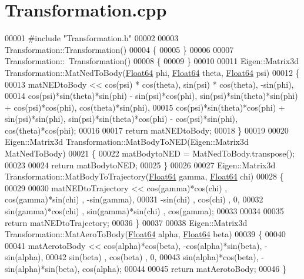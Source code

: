 \hypertarget{_transformation_8cpp_source}{}\section{Transformation.\+cpp}
\label{_transformation_8cpp_source}

\begin{DoxyCode}
00001 \textcolor{preprocessor}{#include "Transformation.h"}
00002 
00003 Transformation::Transformation()
00004 \{
00005 \}
00006 
00007 Transformation::~Transformation()
00008 \{
00009 \}
00010 
00011 Eigen::Matrix3d Transformation::MatNedToBody(\hyperlink{group___tools_ga3f1431cb9f76da10f59246d1d743dc2c}{Float64} phi, \hyperlink{group___tools_ga3f1431cb9f76da10f59246d1d743dc2c}{Float64} theta, 
      \hyperlink{group___tools_ga3f1431cb9f76da10f59246d1d743dc2c}{Float64} psi)
00012 \{
00013     matNEDtoBody << cos(psi) * cos(theta), sin(psi) * cos(theta), -sin(phi),
00014         cos(psi)*sin(theta)*sin(phi) - sin(psi)*cos(phi), sin(psi)*sin(theta)*sin(phi) + cos(psi)*cos(phi),
       cos(theta)*sin(phi),
00015         cos(psi)*sin(theta)*cos(phi) + sin(psi)*sin(phi), sin(psi)*sin(theta)*cos(phi) - cos(psi)*sin(phi),
       cos(theta)*cos(phi);
00016 
00017     \textcolor{keywordflow}{return} matNEDtoBody;
00018 \}
00019 
00020 Eigen::Matrix3d Transformation::MatBodyToNED(Eigen::Matrix3d MatNedToBody)
00021 \{
00022     matBodytoNED = MatNedToBody.transpose();
00023 
00024     \textcolor{keywordflow}{return} matBodytoNED;
00025 \}
00026 
00027 Eigen::Matrix3d Transformation::MatBodyToTrajectory(\hyperlink{group___tools_ga3f1431cb9f76da10f59246d1d743dc2c}{Float64} gamma, 
      \hyperlink{group___tools_ga3f1431cb9f76da10f59246d1d743dc2c}{Float64} chi)
00028 \{
00029 
00030     matNEDtoTrajectory << cos(gamma)*cos(chi)   , cos(gamma)*sin(chi)   , -sin(gamma),
00031                             -sin(chi)           , cos(chi)              , 0,
00032                         sin(gamma)*cos(chi)     , sin(gamma)*sin(chi)   , cos(gamma);
00033 
00034 
00035     \textcolor{keywordflow}{return} matNEDtoTrajectory;
00036 \}
00037 
00038 Eigen::Matrix3d Transformation::MatAeroToBody(\hyperlink{group___tools_ga3f1431cb9f76da10f59246d1d743dc2c}{Float64} alpha, \hyperlink{group___tools_ga3f1431cb9f76da10f59246d1d743dc2c}{Float64} beta)
00039 \{
00040 
00041     matAerotoBody << cos(alpha)*cos(beta), -cos(alpha)*sin(beta),   -sin(alpha),
00042                         sin(beta)        ,      cos(beta)       ,       0,
00043                      sin(alpha)*cos(beta), -sin(alpha)*sin(beta),    cos(alpha);
00044 
00045     \textcolor{keywordflow}{return} matAerotoBody;
00046 \}
\end{DoxyCode}
